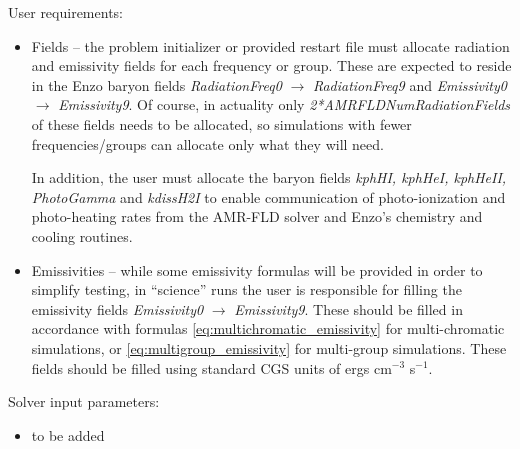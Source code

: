 \documentclass[10pt]{article}
\renewcommand{\(}{\left(}
\renewcommand{\)}{\right)}
\begin{document}
User requirements:
\begin{itemize}
\item Fields -- the problem initializer or provided restart file must
  allocate radiation and emissivity fields for each frequency or
  group.  These are expected to reside in the Enzo baryon fields 
  {\em RadiationFreq0} $\to$ {\em RadiationFreq9} and 
  {\em Emissivity0} $\to$ {\em Emissivity9}.  Of course, in actuality
  only {\em 2*AMRFLDNumRadiationFields} of these fields needs to be
  allocated, so simulations with fewer frequencies/groups can allocate
  only what they will need.

  In addition, the user must allocate the baryon fields {\em kphHI,
  kphHeI, kphHeII, PhotoGamma} and {\em kdissH2I} to enable communication 
  of photo-ionization and photo-heating rates from the AMR-FLD solver and 
  Enzo's chemistry and cooling routines.

\item Emissivities -- while some emissivity formulas will be provided
  in order to simplify testing, in ``science'' runs the user is
  responsible for filling the emissivity fields {\em Emissivity0}
  $\to$ {\em Emissivity9}.  These should be filled in accordance with
  formulas \eqref{eq:multichromatic_emissivity} for multi-chromatic
  simulations, or \eqref{eq:multigroup_emissivity} for multi-group
  simulations.  These fields should be filled using standard CGS units
  of ergs cm$^{-3}$ s$^{-1}$.
\end{itemize}


Solver input parameters:
\begin{itemize}
\item to be added
\end{itemize}





\end{document}
